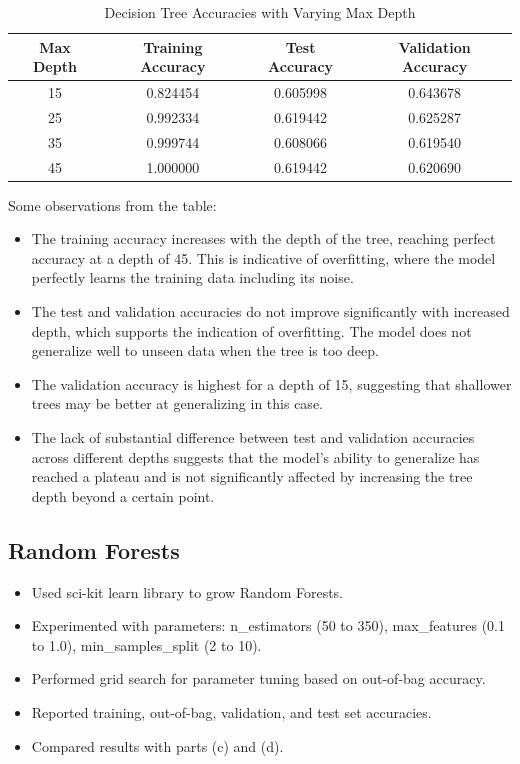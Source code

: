\documentclass[12pt]{article}
\begin{document}
\begin{table}[h]
\centering
\begin{tabular}{|c|c|c|c|}
\hline
\textbf{Max Depth} & \textbf{Training Accuracy} & \textbf{Test Accuracy} & \textbf{Validation Accuracy} \\ \hline
15                 & 0.824454                   & 0.605998               & 0.643678                     \\ \hline
25                 & 0.992334                   & 0.619442               & 0.625287                     \\ \hline
35                 & 0.999744                   & 0.608066               & 0.619540                     \\ \hline
45                 & 1.000000                   & 0.619442               & 0.620690                     \\ \hline
\end{tabular}
\caption{Decision Tree Accuracies with Varying Max Depth}
\label{table:decision_tree_accuracies}
\end{table}

Some observations from the table:
\begin{itemize}
  \item The training accuracy increases with the depth of the tree, reaching perfect accuracy at a depth of 45. This is indicative of overfitting, where the model perfectly learns the training data including its noise.
  \item The test and validation accuracies do not improve significantly with increased depth, which supports the indication of overfitting. The model does not generalize well to unseen data when the tree is too deep.
  \item The validation accuracy is highest for a depth of 15, suggesting that shallower trees may be better at generalizing in this case.
  \item The lack of substantial difference between test and validation accuracies across different depths suggests that the model's ability to generalize has reached a plateau and is not significantly affected by increasing the tree depth beyond a certain point.
\end{itemize}


\subsection{Random Forests}
    \begin{itemize}
        \item Used sci-kit learn library to grow Random Forests.
        \item Experimented with parameters: n\_estimators (50 to 350), max\_features (0.1 to 1.0), min\_samples\_split (2 to 10).
        \item Performed grid search for parameter tuning based on out-of-bag accuracy.
        \item Reported training, out-of-bag, validation, and test set accuracies.
        \item Compared results with parts (c) and (d).
    \end{itemize}
\end{document}
